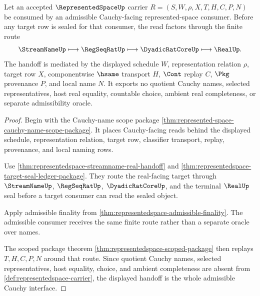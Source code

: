 \begin{theorem}
\label{thm:represented-space-admissible-cauchy-handoff}
Let an accepted $\RepresentedSpaceUp$ carrier $R=(S,W,\rho,X,T,H,C,P,N)$ be consumed by an admissible Cauchy-facing represented-space consumer. Before any target row is sealed for that consumer, the read factors through the finite route
$$
\StreamNameUp \longmapsto \RegSeqRatUp \longmapsto \DyadicRatCoreUp \longmapsto \RealUp .
$$
The handoff is mediated by the displayed schedule $W$, representation relation $\rho$, target row $X$, componentwise $\hsame$ transport $H$, $\Cont$ replay $C$, $\Pkg$ provenance $P$, and local name $N$. It exports no quotient Cauchy names, selected representatives, host real equality, countable choice, ambient real completeness, or separate admissibility oracle.
\end{theorem}
\begin{proof}
Begin with the Cauchy-name scope package \autoref{thm:represented-space-cauchy-name-scope-package}. It places Cauchy-facing reads behind the displayed schedule, representation relation, target row, classifier transport, replay, provenance, and local naming rows.

Use \autoref{thm:representedspace-streamname-real-handoff} and \autoref{thm:representedspace-target-seal-ledger-package}. They route the real-facing target through $\StreamNameUp$, $\RegSeqRatUp$, $\DyadicRatCoreUp$, and the terminal $\RealUp$ seal before a target consumer can read the sealed object.

Apply admissible finality from \autoref{thm:representedspace-admissible-finality}. The admissible consumer receives the same finite route rather than a separate oracle over names.

The scoped package theorem \autoref{thm:representedspace-scoped-package} then replays $T,H,C,P,N$ around that route. Since quotient Cauchy names, selected representatives, host equality, choice, and ambient completeness are absent from \autoref{def:representedspace-carrier}, the displayed handoff is the whole admissible Cauchy interface.
\end{proof}


